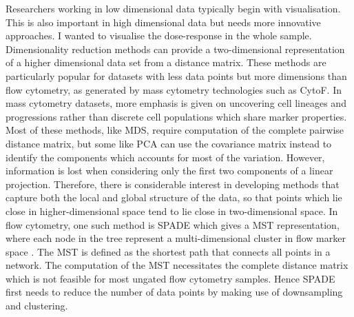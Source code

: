 Researchers working in low dimensional data typically begin with visualisation.
This is also important in high dimensional data but needs more innovative approaches.
I wanted to visualise the dose-response in the whole sample.
Dimensionality reduction methods can provide a two-dimensional representation of a higher dimensional data set from a distance matrix.
These methods are particularly popular for datasets with less data points but more dimensions than flow cytometry,
as generated by mass cytometry technologies such as CytoF.
In mass cytometry datasets, more emphasis is given on uncovering cell lineages and progressions rather than discrete cell populations which share marker
properties.
Most of these methods, like \gls{MDS}, require computation of the complete pairwise distance matrix,
but some like \gls{PCA} can use the covariance matrix instead to identify the components which accounts for most of the variation. 
However, information is lost when considering only the first two components of a linear projection.
Therefore, there is considerable interest in developing methods that capture both the local and global structure of the data,
so that points which lie close in higher-dimensional space tend to lie close in two-dimensional space.
In flow cytometry, one such method is \acrfull{SPADE} which gives a \acrfull{MST} representation,
where each node in the tree represent a multi-dimensional cluster in flow marker space \citep{Simonds:2011jh}.
The \gls{MST} is defined as the shortest path that connects all points in a network.
The computation of the \gls{MST} necessitates the complete distance matrix which is not feasible for most ungated flow cytometry samples.
Hence \gls{SPADE} first needs to reduce the number of data points by making use of downsampling and clustering.
